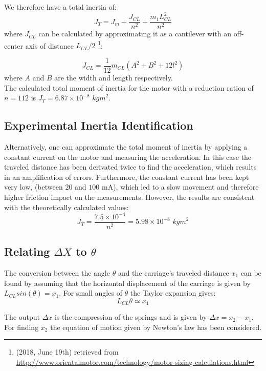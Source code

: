 	We therefore have a total inertia of:
	\begin{equation}
		J_T = J_m + \frac{J_{CL}}{n^2} + \frac{ m_1 L_{CL}^2}{n^2}
	\end{equation}
	where $J_{CL}$ can be calculated by approximating it as a cantilever with an off-center axis of distance $L_{CL} /2$ \footnote{(2018, June 19th) retrieved from \url{http://www.orientalmotor.com/technology/motor-sizing-calculations.html}}: %
	
	\begin{equation}
		J_{CL} = \frac{1}{12}m_{CL}(A^2 + B^2 + 12l^2)
	\end{equation}
	where $A$ and $B$ are the width and length respectively.\\
	The calculated total moment of inertia for the motor with a reduction ration of $n = 112$ is $J_T = 6.87 \times 10^{-8}$ $\textit{kgm}^2$.
	
	\subsection{Experimental Inertia Identification}
	Alternatively, one can approximate the total moment of inertia by applying a constant current on the motor and measuring the acceleration. In this case the traveled distance has been derivated twice to find the acceleration, which results in an amplification of errors. Furthermore, the constant current has been kept very low, (between $20$ and $100$ mA), which led to a slow movement and therefore higher friction impact on the measurements. However, the results are consistent with the theoretically calculated values:
	$$ J_T = \frac{7.5 \times 10^{-4}}{n^2} = 5.98 \times 10^{-8} \textit{ kgm}^2$$ 
	
	\subsection{Relating $\Delta X$ to $\theta$}
	The conversion between the angle $\theta$ and the carriage's traveled distance $x_1$ can be found by assuming that the horizontal displacement of the carriage is given by $L_{CL} sin(\theta) = x_1$. For small angles of $\theta$ the Taylor expansion gives:
	\begin{equation}
		L_{CL} \theta \simeq x_1
		\label{eq:assum}
	\end{equation} 
	
	The output $\Delta x$ is the compression of the springs and is given by $\Delta x = x_2 - x_1$. For finding $x_2$ the equation of motion given by Newton's law has been considered.
	
